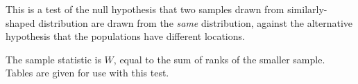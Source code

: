 This is a test of the null hypothesis that two samples drawn from similarly-shaped distribution are drawn from the \emph{same} distribution, against the alternative hypothesis that the populations have different locations.
\par
The sample statistic is $W$, equal to the sum of ranks of the
smaller sample. Tables are given for use with this test.

  